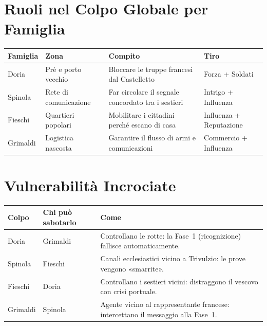 \section{Ruoli nel Colpo Globale per Famiglia}
\label{sec:ref-ruoli}

\begin{center}
\begin{tabularx}{\textwidth}{L{2.2cm} L{3cm} X L{3.2cm}}
  \toprule
  \textbf{Famiglia} & \textbf{Zona} & \textbf{Compito} & \textbf{Tiro} \\
  \midrule
  Doria    & Prè e porto vecchio    & Bloccare le truppe francesi dal Castelletto & Forza + Soldati \\
  Spinola  & Rete di comunicazione  & Far circolare il segnale concordato tra i sestieri & Intrigo + Influenza \\
  Fieschi  & Quartieri popolari     & Mobilitare i cittadini perché escano di casa & Influenza + Reputazione \\
  Grimaldi & Logistica nascosta     & Garantire il flusso di armi e comunicazioni & Commercio + Influenza \\
  \bottomrule
\end{tabularx}
\end{center}

\section{Vulnerabilità Incrociate}
\label{sec:ref-vulnerabilita}

\begin{center}
\begin{tabular}{L{2.8cm} L{2.8cm} p{8cm}}
  \toprule
  \textbf{Colpo} & \textbf{Chi può sabotarlo} & \textbf{Come} \\
  \midrule
  Doria    & Grimaldi  & Controllano le rotte: la Fase~1 (ricognizione) fallisce automaticamente. \\
  Spinola  & Fieschi   & Canali ecclesiastici vicino a Trivulzio: le prove vengono «smarrite». \\
  Fieschi  & Doria     & Controllano i sestieri vicini: distraggono il vescovo con crisi portuale. \\
  Grimaldi & Spinola   & Agente vicino al rappresentante francese: intercettano il messaggio alla Fase~1. \\
  \bottomrule
\end{tabular}
\end{center}

